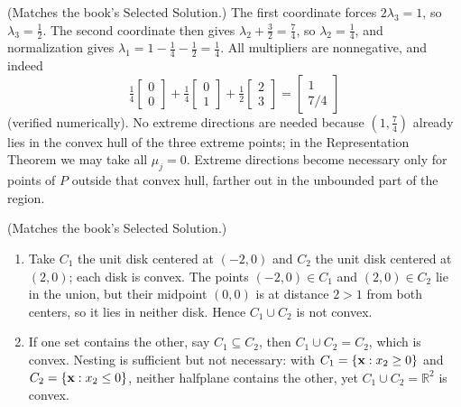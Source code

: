 (Matches the book's Selected Solution.) The first coordinate forces $2\lambda_3 = 1$, so $\lambda_3 = \tfrac12$. The second coordinate then gives $\lambda_2 + \tfrac32 = \tfrac74$, so $\lambda_2 = \tfrac14$, and normalization gives $\lambda_1 = 1 - \tfrac14 - \tfrac12 = \tfrac14$. All multipliers are nonnegative, and indeed
\[
\tfrac14 \begin{bmatrix} 0 \\ 0 \end{bmatrix} + \tfrac14 \begin{bmatrix} 0 \\ 1 \end{bmatrix} + \tfrac12 \begin{bmatrix} 2 \\ 3 \end{bmatrix} = \begin{bmatrix} 1 \\ 7/4 \end{bmatrix}
\]
(verified numerically). No extreme directions are needed because $(1, \tfrac74)$ already lies in the convex hull of the three extreme points; in the Representation Theorem we may take all $\mu_j = 0$. Extreme directions become necessary only for points of $P$ outside that convex hull, farther out in the unbounded part of the region.

(Matches the book's Selected Solution.)
\begin{enumerate}
\item Take $C_1$ the unit disk centered at $(-2, 0)$ and $C_2$ the unit disk centered at $(2, 0)$; each disk is convex. The points $(-2, 0) \in C_1$ and $(2, 0) \in C_2$ lie in the union, but their midpoint $(0,0)$ is at distance $2 > 1$ from both centers, so it lies in neither disk. Hence $C_1 \cup C_2$ is not convex.
\item If one set contains the other, say $C_1 \subseteq C_2$, then $C_1 \cup C_2 = C_2$, which is convex. Nesting is sufficient but not necessary: with $C_1 = \{\mathbf{x} : x_2 \geq 0\}$ and $C_2 = \{\mathbf{x} : x_2 \leq 0\}$, neither halfplane contains the other, yet $C_1 \cup C_2 = \mathbb{R}^2$ is convex.
\end{enumerate}

